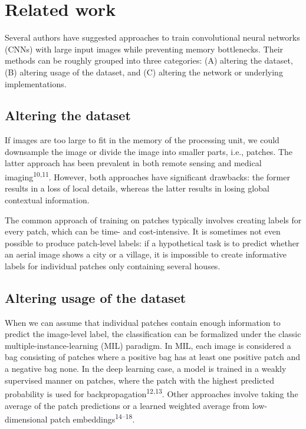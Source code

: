 \documentclass[
  12pt,
  a5,margin=2cmpaper,
]{article}
\begin{document}
\hypertarget{related-work}{%
\section{Related work}\label{related-work}}

Several authors have suggested approaches to train convolutional neural
networks (CNNs) with large input images while preventing memory
bottlenecks. Their methods can be roughly grouped into three categories:
(A) altering the dataset, (B) altering usage of the dataset, and (C)
altering the network or underlying implementations.

\hypertarget{altering-the-dataset}{%
\subsection{Altering the dataset}\label{altering-the-dataset}}

If images are too large to fit in the memory of the processing unit, we
could downsample the image or divide the image into smaller parts, i.e.,
patches. The latter approach has been prevalent in both remote sensing
and medical imaging\textsuperscript{10,11}. However, both approaches
have significant drawbacks: the former results in a loss of local
details, whereas the latter results in losing global contextual
information.

The common approach of training on patches typically involves creating
labels for every patch, which can be time- and cost-intensive. It is
sometimes not even possible to produce patch-level labels: if a
hypothetical task is to predict whether an aerial image shows a city or
a village, it is impossible to create informative labels for individual
patches only containing several houses.

\hypertarget{altering-usage-of-the-dataset}{%
\subsection{Altering usage of the
dataset}\label{altering-usage-of-the-dataset}}

When we can assume that individual patches contain enough information to
predict the image-level label, the classification can be formalized
under the classic multiple-instance-learning (MIL) paradigm. In MIL,
each image is considered a bag consisting of patches where a positive
bag has at least one positive patch and a negative bag none. In the deep
learning case, a model is trained in a weakly supervised manner on
patches, where the patch with the highest predicted probability is used
for backpropagation\textsuperscript{12,13}. Other approaches involve
taking the average of the patch predictions or a learned weighted
average from low-dimensional patch embeddings\textsuperscript{14--18}.
\end{document}
